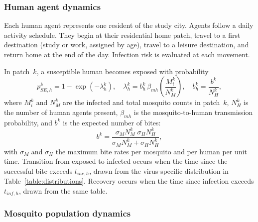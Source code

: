 \documentclass[applsci,article,accept,pdftex,moreauthors]{Definitions/mdpi}
\begin{document}
\subsubsection{Human agent dynamics}
\label{sec:humans}

Each human agent represents one resident of the study city. Agents follow a daily activity schedule. They begin at their residential home patch, travel to a first destination (study or work, assigned by age), travel to a leisure destination, and return home at the end of the day. Infection risk is evaluated at each movement.

In patch~$k$, a susceptible human becomes exposed with probability
\begin{equation}
p_{SE,h}^{k} = 1 - \exp\!\left(-\lambda_h^{k}\right),
\quad
\lambda_h^{k} = b_h^{k}\,\beta_{mh}\left(\frac{M_i^{k}}{N_M^{k}}\right),
\quad
b_h^{k} = \frac{b^{k}}{N_H^{k}},
\label{eq:human_infection}
\end{equation}
where $M_i^{k}$ and $N_M^{k}$ are the infected and total mosquito counts in patch~$k$, $N_H^{k}$ is the number of human agents present, $\beta_{mh}$ is the mosquito-to-human transmission probability, and $b^k$ is the expected number of bites:
\begin{equation}
b^{k} =
\frac{\sigma_M N_M^{k}\;\sigma_H N_H^{k}}
     {\sigma_M N_M^{k} + \sigma_H N_H^{k}},
\label{eq:bites}
\end{equation}
with $\sigma_M$ and $\sigma_H$ the maximum bite rates per mosquito and per human per unit time. Transition from exposed to infected occurs when the time since the successful bite exceeds $t_{inc,h}$, drawn from the virus-specific distribution in Table~\ref{table:distributions}. Recovery occurs when the time since infection exceeds $t_{inf,h}$, drawn from the same table.

\subsubsection{Mosquito population dynamics}
\label{sec:mosquitoes}
\end{document}
